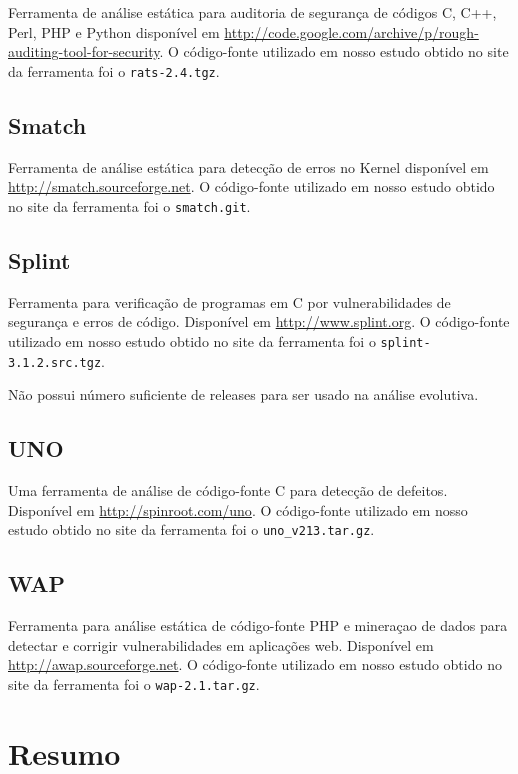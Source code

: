 Ferramenta de análise estática para auditoria de segurança 
de códigos C, C++, Perl, PHP e Python disponível em
\url{http://code.google.com/archive/p/rough-auditing-tool-for-security}. O
código-fonte utilizado em nosso estudo obtido no site da ferramenta foi o
\texttt{rats-2.4.tgz}.

\subsection{Smatch}

Ferramenta de análise estática para detecção de erros no Kernel disponível em
\url{http://smatch.sourceforge.net}. O código-fonte utilizado em nosso estudo
obtido no site da ferramenta foi o \texttt{smatch.git}.

\subsection{Splint}

Ferramenta para verificação de programas em C por vulnerabilidades de segurança e
erros de código. Disponível em \url{http://www.splint.org}. O código-fonte
utilizado em nosso estudo obtido no site da ferramenta foi o
\texttt{splint-3.1.2.src.tgz}.

Não possui número suficiente de releases para ser usado na análise evolutiva.

\subsection{UNO}

Uma ferramenta de análise de código-fonte C para detecção de defeitos.
Disponível em \url{http://spinroot.com/uno}. O código-fonte utilizado em nosso
estudo obtido no site da ferramenta foi o \texttt{uno\_v213.tar.gz}.

\subsection{WAP}

Ferramenta para análise estática de código-fonte PHP e mineraçao de dados para
detectar e corrigir vulnerabilidades em aplicações web. Disponível em
\url{http://awap.sourceforge.net}. O código-fonte utilizado em nosso estudo
obtido no site da ferramenta foi o \texttt{wap-2.1.tar.gz}.

\section{Resumo}

